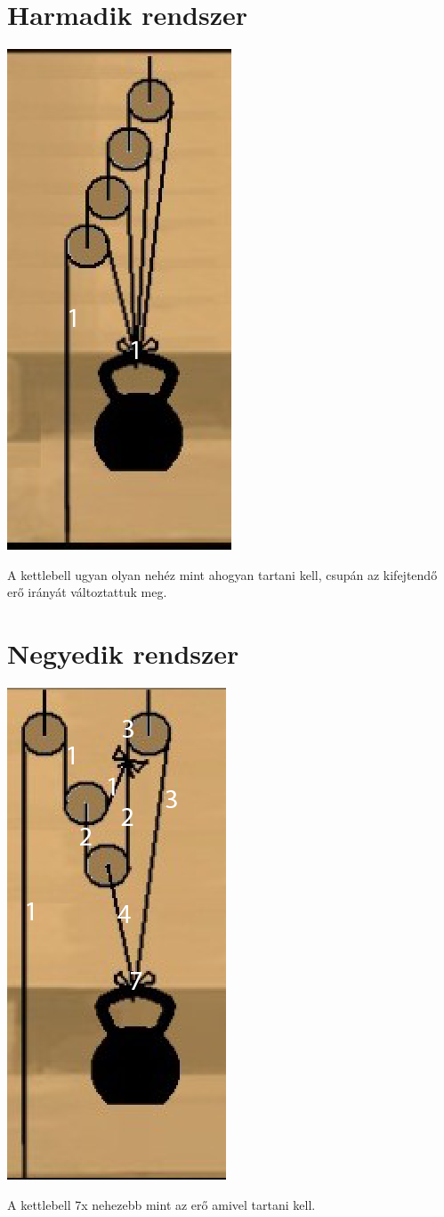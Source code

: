 \documentclass{article}[12pt,a4paper]
\begin{document}
\section{Harmadik rendszer}
\begin{center}
\includegraphics[scale=0.5]{3kettle}
\end{center}
A kettlebell ugyan olyan nehéz mint ahogyan tartani kell, csupán az kifejtendő erő irányát változtattuk meg.

\section{Negyedik rendszer}
\begin{center}
\includegraphics[scale=0.5]{4kettle}
\end{center}
A kettlebell 7x nehezebb mint az erő amivel tartani kell.
\end{document}
